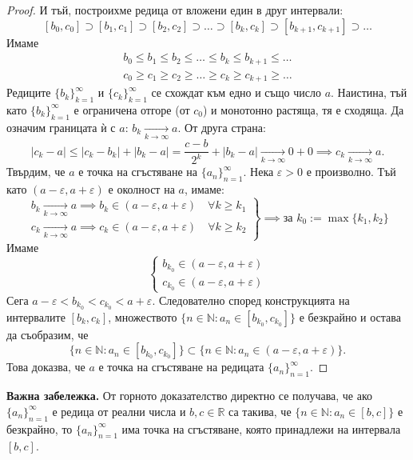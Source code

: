 \begin{proof}
И тъй, построихме редица от вложени един в друг интервали:
\[
[b_0, c_0] \supset [b_1, c_1] \supset [b_2, c_2] \supset \dots \supset [b_k, c_k] \supset [b_{k+1}, c_{k+1}] \supset \dots
\]
Имаме
\[
\begin{aligned}
b_0 \le b_1 \le b_2 \le \dots \le b_k \le b_{k+1} \le \dots \\
c_0 \ge c_1 \ge c_2 \ge \dots \ge c_k \ge c_{k+1} \ge \dots
\end{aligned}
\]
Редиците $\{b_k\}_{k=1}^{\infty}$ и $\{c_k\}_{k=1}^{\infty}$ се схождат към едно и също число $a$. Наистина, тъй като $\{b_k\}_{k=1}^{\infty}$ е ограничена отгоре (от $c_0$) и монотонно растяща, тя е сходяща. Да означим границата ѝ с $a$: $b_k \xrightarrow[k\to\infty]{} a$. От друга страна:
\[
|c_k - a| \le |c_k - b_k| + |b_k - a| = \frac{c - b}{2^k} + |b_k - a| \xrightarrow[k\to\infty]{} 0 + 0 \implies c_k \xrightarrow[k\to\infty]{} a.
\]
Твърдим, че $a$ е точка на сгъстяване на $\{a_n\}_{n=1}^{\infty}$. Нека $\varepsilon > 0$ е произволно. Тъй като $(a - \varepsilon, a + \varepsilon)$ е околност на $a$, имаме:
\[
\left.
\begin{aligned}
b_k \xrightarrow[k\to\infty]{} a \implies b_k \in (a - \varepsilon, a + \varepsilon) \quad \forall k \ge k_1 \\
c_k \xrightarrow[k\to\infty]{} a \implies c_k \in (a - \varepsilon, a + \varepsilon) \quad \forall k \ge k_2
\end{aligned}
\right\} \implies \text{за } k_0 := \max\{k_1, k_2\}
\]
Имаме
\[
\begin{cases}
b_{k_0} \in (a - \varepsilon, a + \varepsilon) \\
c_{k_0} \in (a - \varepsilon, a + \varepsilon)
\end{cases}
\]
Сега $a - \varepsilon < b_{k_0} < c_{k_0} < a + \varepsilon$. Следователно според конструкцията на интервалите $[b_k, c_k]$, множеството $\{n \in \mathbb{N} : a_n \in [b_{k_0}, c_{k_0}]\}$ е безкрайно и остава да съобразим, че
\[
\{n \in \mathbb{N} : a_n \in [b_{k_0}, c_{k_0}]\} \subset \{n \in \mathbb{N} : a_n \in (a - \varepsilon, a + \varepsilon)\}.
\]
Това доказва, че $a$ е точка на сгъстяване на редицата $\{a_n\}_{n=1}^{\infty}$.
\end{proof}

\noindent\textbf{Важна забележка.} От горното доказателство директно се получава, че ако $\{a_n\}_{n=1}^{\infty}$ е редица от реални числа и $b, c \in \mathbb{R}$ са такива, че $\{n \in \mathbb{N} : a_n \in [b, c]\}$ е безкрайно, то $\{a_n\}_{n=1}^{\infty}$ има точка на сгъстяване, която принадлежи на интервала $[b, c]$.

